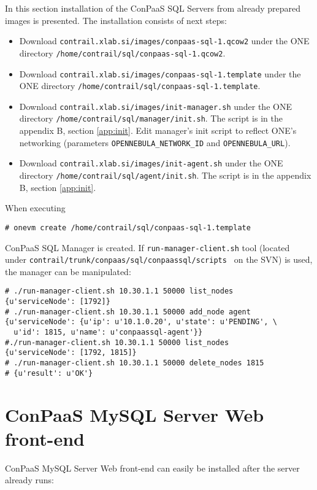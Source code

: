 \documentclass[a4paper,10pt]{article}
\begin{document}
In this section installation of the ConPaaS SQL Servers from already prepared images is presented. The installation consists of next steps:

\begin{itemize}
	\item Download {\tt contrail.xlab.si/images/conpaas-sql-1.qcow2} under the ONE directory {\tt /home/contrail/sql/conpaas-sql-1.qcow2}.
	\item Download {\tt contrail.xlab.si/images/conpaas-sql-1.template} under the ONE directory {\tt /home/contrail/sql/conpaas-sql-1.template}.
	\item Download {\tt contrail.xlab.si/images/init-manager.sh} under the ONE directory {\tt /home/contrail/sql/manager/init.sh}. The script is in the appendix B, section \ref{app:init}. Edit manager's init script to reflect ONE's networking (parameters {\tt OPENNEBULA\_NETWORK\_ID} and {\tt OPENNEBULA\_URL}).
	\item Download {\tt contrail.xlab.si/images/init-agent.sh} under the ONE directory {\tt /home/contrail/sql/agent/init.sh}. The script is in the appendix B, section \ref{app:init}.
\end{itemize}

When executing
\begin{Verbatim}[frame=single]
# onevm create /home/contrail/sql/conpaas-sql-1.template
\end{Verbatim}

ConPaaS SQL Manager is created. If {\tt run-manager-client.sh} tool (located under {\tt contrail/trunk/conpaas/sql/conpaassql/scripts } on the SVN) is used, the manager can be manipulated:

\begin{Verbatim}[frame=single]
# ./run-manager-client.sh 10.30.1.1 50000 list_nodes
{u'serviceNode': [1792]}
# ./run-manager-client.sh 10.30.1.1 50000 add_node agent
{u'serviceNode': {u'ip': u'10.1.0.20', u'state': u'PENDING', \
  u'id': 1815, u'name': u'conpaassql-agent'}}
#./run-manager-client.sh 10.30.1.1 50000 list_nodes
{u'serviceNode': [1792, 1815]}
# ./run-manager-client.sh 10.30.1.1 50000 delete_nodes 1815
# {u'result': u'OK'}
\end{Verbatim}

\section{ConPaaS MySQL Server Web front-end}
\label{sec:web-front-end}
ConPaaS MySQL Server Web front-end can easily be installed after the server already runs: 
\end{document}
